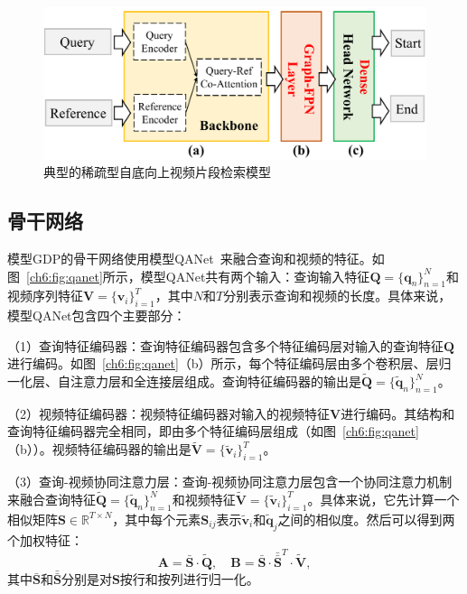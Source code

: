 \begin{figure}[t]
    \centering
    \includegraphics[width=0.8\linewidth]{chapter6/res/dense_bu.pdf}
    \caption{典型的稀疏型自底向上视频片段检索模型}
    \label{ch6:fig:dense_bu}
\end{figure}

\subsection{骨干网络}
模型GDP的骨干网络使用模型QANet~\cite{yu2018qanet}来融合查询和视频的特征。如图~\ref{ch6:fig:qanet}所示，模型QANet共有两个输入：查询输入特征$\bm{Q} = \{\bm{q}_n\}^N_{n=1}$和视频序列特征$\bm{V}=\{\bm{v}_i\}^T_{i=1}$，其中$N$和$T$分别表示查询和视频的长度。具体来说，模型QANet包含四个主要部分：

（1）查询特征编码器：查询特征编码器包含多个特征编码层对输入的查询特征$\bm{Q}$进行编码。如图~\ref{ch6:fig:qanet}（b）所示，每个特征编码层由多个卷积层、层归一化层、自注意力层和全连接层组成。查询特征编码器的输出是$\bm{\tilde{Q}}=\{\bm{\tilde{q}}_n\}^N_{n=1}$。

（2）视频特征编码器：视频特征编码器对输入的视频特征$\bm{V}$进行编码。其结构和查询特征编码器完全相同，即由多个特征编码层组成（如图~\ref{ch6:fig:qanet}（b））。视频特征编码器的输出是$\bm{\tilde{V}} = \{\bm{\tilde{v}}_i\}^T_{i=1}$。

（3）查询-视频协同注意力层：查询-视频协同注意力层包含一个协同注意力机制来融合查询特征$\bm{\tilde{Q}}=\{\bm{\tilde{q}}_n\}^N_{n=1}$和视频特征$\bm{\tilde{V}} = \{\bm{\tilde{v}}_i\}^T_{i=1}$。具体来说，它先计算一个相似矩阵$\bm{S}\in\mathbb{R}^{T\times N}$，其中每个元素$\bm{S}_{ij}$表示$\bm{\tilde{v}}_i$和$\bm{\tilde{q}}_j$之间的相似度。然后可以得到两个加权特征：
\begin{equation}
  \bm{A} = \bar{\bm{S}} \cdot \tilde{\bm{Q}}, \quad \bm{B} = \bar{\bm{S}} \cdot \bar{\bar{\bm{S}}}^T \cdot \tilde{\bm{V}},
\end{equation}
其中$\bar{\bm{S}}$和$\bar{\bar{\bm{S}}}$分别是对$\bm{S}$按行和按列进行归一化。

